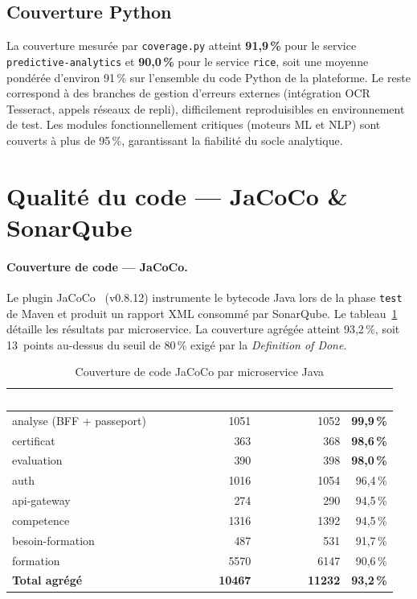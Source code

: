 \documentclass[12pt,a4paper]{report}
\renewcommand{\thead}[1]{\cellcolor{espritblue}\textcolor{white}{\textbf{#1}}}
\begin{document}
\subsection{Couverture Python}

La couverture mesurée par \texttt{coverage.py} atteint \textbf{91,9\,\%} pour le
service \texttt{predictive-analytics} et \textbf{90,0\,\%} pour le service
\texttt{rice}, soit une moyenne pondérée d'environ 91\,\% sur l'ensemble du
code Python de la plateforme. Le reste correspond à des branches de gestion
d'erreurs externes (intégration OCR Tesseract, appels réseaux de repli),
difficilement reproduisibles en environnement de test. Les modules
fonctionnellement critiques (moteurs ML et NLP) sont couverts à plus de
95\,\%, garantissant la fiabilité du socle analytique.

\section{Qualité du code --- JaCoCo \& SonarQube}

\paragraph{Couverture de code --- JaCoCo.}
Le plugin JaCoCo~\cite{jacoco} (v0.8.12) instrumente le bytecode Java lors de la
phase \texttt{test} de Maven et produit un rapport XML consommé par SonarQube.
Le tableau~\ref{tab:jacoco} détaille les résultats par microservice. La
couverture agrégée atteint 93,2\,\%, soit 13~points au-dessus du seuil de 80\,\%
exigé par la \emph{Definition of Done}.

\begin{table}[H]
\centering
\caption{Couverture de code JaCoCo par microservice Java}
\label{tab:jacoco}
{\small\renewcommand{\arraystretch}{1.15}
\begin{tabularx}{\textwidth}{X r r r}
\toprule
\thead{Microservice} & \thead{Lignes couvertes} & \thead{Lignes totales} & \thead{Taux} \\
\midrule
analyse (BFF + passeport)     & 1051 & 1052 & \textbf{99,9\,\%} \\
certificat                    & 363  & 368  & \textbf{98,6\,\%} \\
evaluation                    & 390  & 398  & \textbf{98,0\,\%} \\
auth                          & 1016 & 1054 & 96,4\,\% \\
api-gateway                   & 274  & 290  & 94,5\,\% \\
competence                    & 1316 & 1392 & 94,5\,\% \\
besoin-formation              & 487  & 531  & 91,7\,\% \\
formation                     & 5570 & 6147 & 90,6\,\% \\
\midrule
\textbf{Total agrégé}         & \textbf{10467} & \textbf{11232} & \textbf{93,2\,\%} \\
\bottomrule
\end{tabularx}}
\end{table}
\end{document}
